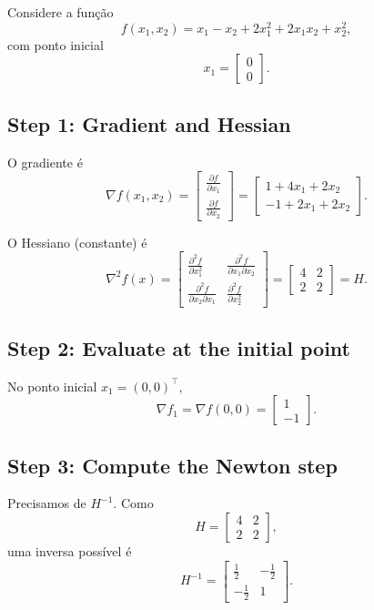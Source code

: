 \documentclass[9pt,a4paper]{extarticle}
\begin{document}
Considere a função
\[
f(x_1, x_2) = x_1 - x_2 + 2x_1^2 + 2x_1 x_2 + x_2^2,
\]
com ponto inicial
\[
x_1 =
\begin{bmatrix}
0\\
0
\end{bmatrix}.
\]

\subsection*{Step 1: Gradient and Hessian}

O gradiente é
\[
\nabla f(x_1, x_2) =
\begin{bmatrix}
\frac{\partial f}{\partial x_1}\\[4pt]
\frac{\partial f}{\partial x_2}
\end{bmatrix}
=
\begin{bmatrix}
1 + 4x_1 + 2x_2\\[4pt]
-1 + 2x_1 + 2x_2
\end{bmatrix}.
\]

O Hessiano (constante) é
\[
\nabla^2 f(x) =
\begin{bmatrix}
\frac{\partial^2 f}{\partial x_1^2} & \frac{\partial^2 f}{\partial x_1 \partial x_2}\\[4pt]
\frac{\partial^2 f}{\partial x_2 \partial x_1} & \frac{\partial^2 f}{\partial x_2^2}
\end{bmatrix}
=
\begin{bmatrix}
4 & 2\\[4pt]
2 & 2
\end{bmatrix}
= H.
\]

\subsection*{Step 2: Evaluate at the initial point}

No ponto inicial $x_1 = (0,0)^\top$,
\[
\nabla f_1 = \nabla f(0,0) =
\begin{bmatrix}
1\\
-1
\end{bmatrix}.
\]

\subsection*{Step 3: Compute the Newton step}

Precisamos de $H^{-1}$. Como
\[
H =
\begin{bmatrix}
4 & 2\\[4pt]
2 & 2
\end{bmatrix},
\]
uma inversa possível é
\[
H^{-1}
=
\begin{bmatrix}
\frac12 & -\frac12\\[4pt]
-\frac12 & 1
\end{bmatrix}.
\]
\end{document}
